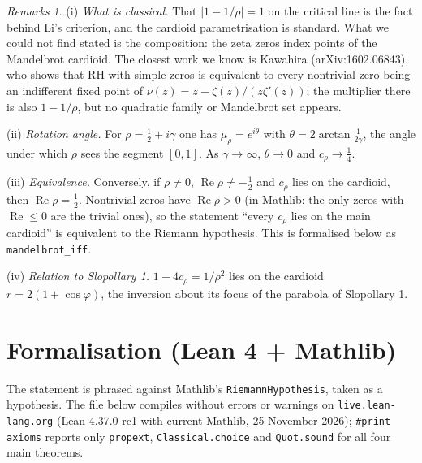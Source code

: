 \documentclass[11pt,a4paper]{article}
\theoremstyle{remark}\newtheorem*{remark}{Remarks}
\begin{document}
\begin{remark}
(i) \emph{What is classical.} That $|1-1/\rho|=1$ on the critical line is the
fact behind Li's criterion, and the cardioid parametrisation is standard. What we
could not find stated is the composition: the zeta zeros index points of the
Mandelbrot cardioid. The closest work we know is Kawahira (arXiv:1602.06843), who
shows that RH with simple zeros is equivalent to every nontrivial zero being an
indifferent fixed point of $\nu(z)=z-\zeta(z)/(z\zeta'(z))$; the multiplier there is
also $1-1/\rho$, but no quadratic family or Mandelbrot set appears.

(ii) \emph{Rotation angle.} For $\rho=\tfrac12+i\gamma$ one has
$\mu_\rho=e^{i\theta}$ with $\theta=2\arctan\frac{1}{2\gamma}$, the angle under which
$\rho$ sees the segment $[0,1]$. As $\gamma\to\infty$, $\theta\to0$ and $c_\rho\to\tfrac14$.

(iii) \emph{Equivalence.} Conversely, if $\rho\neq0$, $\operatorname{Re}\rho\neq-\tfrac12$ and $c_\rho$ lies on the cardioid, then $\operatorname{Re}\rho=\tfrac12$. Nontrivial zeros have $\operatorname{Re}\rho>0$ (in Mathlib: the only zeros with $\operatorname{Re}\le0$ are the trivial ones), so the statement ``every $c_\rho$ lies on the main cardioid'' is equivalent to the Riemann hypothesis. This is formalised below as \texttt{mandelbrot\_iff}.

(iv) \emph{Relation to Slopollary 1.} $1-4c_\rho=1/\rho^{2}$ lies on the cardioid
$r=2(1+\cos\varphi)$, the inversion about its focus of the parabola of Slopollary 1.
\end{remark}

\section*{Formalisation (Lean 4 + Mathlib)}
The statement is phrased against Mathlib's \texttt{RiemannHypothesis}, taken as a
hypothesis. The file below compiles without errors or warnings on
\texttt{live.lean-lang.org} (Lean 4.37.0-rc1 with current Mathlib, 25 November 2026);
\texttt{\#print axioms} reports only \texttt{propext}, \texttt{Classical.choice}
and \texttt{Quot.sound} for all four main theorems.
\end{document}
